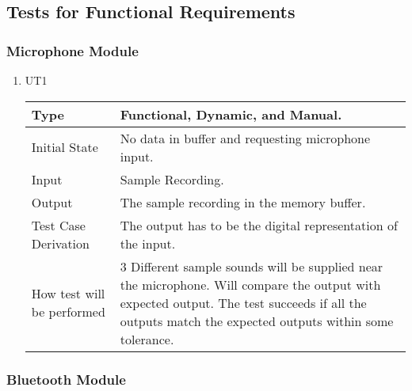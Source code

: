 \documentclass[12pt, titlepage]{article}
\begin{document}
\subsection{Tests for Functional Requirements}

\subsubsection{Microphone Module}


\begin{enumerate}

\item{UT1\\}

\begin{tabular}{ |p{5cm}||p{7cm}| }
    \hline
    Type & Functional, Dynamic, and Manual. \\
    \hline
    Initial State  &  No data in buffer and requesting microphone input.\\
    \hline
    Input &   Sample Recording.  \\
    \hline
    Output &   The sample recording in the memory buffer.  \\
    \hline
    Test Case Derivation &   The output has to be the digital representation of the input.\\
    \hline
    How test will be performed & 3 Different sample sounds will be supplied near the microphone. Will compare the output with expected output. The test succeeds if all the outputs match the expected outputs within some tolerance.     \\
    \hline
\end{tabular}
    
\end{enumerate}

\subsubsection{Bluetooth Module}
\end{document}
